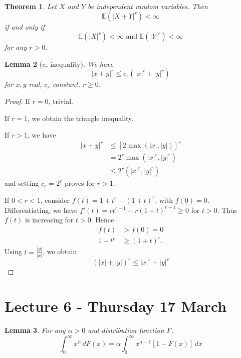 \documentclass[10pt, oneside, reqno]{amsart}
\theoremstyle{plain}%
\newtheorem{thm}{Theorem}[section]
\newtheorem{lem}[thm]{Lemma}
\theoremstyle{definition}
\theoremstyle{remark}
\newcommand{\E}{\mathbb{E}}
\begin{document}
\begin{thm}
	Let $X$ and $Y$ be independent random variables.  Then \[
		\E(|X+Y|^r) < \infty
	\] if and only if \[
		\E(|X|^r) < \infty \text{ and } \E(|Y|^r) < \infty
	\] for any $r > 0$.
\end{thm}

\begin{lem}[$c_r$ inequality]
	We have \[
		|x+y|^r \leq c_r \left( |x|^r + |y|^r \right) 
	\] for $x,y$ real, $c_r$ constant, $r \geq 0$.
\end{lem}
\begin{proof}
	If $r = 0$, trivial.  
	
	If $r = 1$, we obtain the triangle inequality.
	
	If $r > 1$, we have \begin{align*}
		|x+y|^r &\leq [ 2 \max( |x|, |y|) ]^r \\
				&= 2^r \max(|x|^r, |y|^r) \\
				&\leq 2^r (|x|^r, |y|^r)
	\end{align*} and setting $c_r = 2^r$ proves for $r > 1$.
					
	If $ 0 < r < 1$, consider $f(t) = 1 + t^r - (1+t)^r$, with $f(0) = 0$.  Differentiating, we have $f'(t) = rt^{r-1} - r(1+t)^{r-1} \geq 0$ for $t > 0$.  Thus $f(t)$ is increasing for $t >0$.  Hence \begin{align*}
		f(t) &> f(0) = 0 \\
		1+t^r &\geq (1+t)^r.
	\end{align*}  Using $t = \frac{|y|}{|x|}$, we obtain \[
		(|x| + |y|)^r \leq |x|^r + |y|^r
	\]
	
\end{proof}


\section{Lecture 6 - Thursday 17 March} %
\label{sec:lecture_6_thursday_17_march}
\begin{lem}
	For any $\alpha > 0$ and distribution function $F$, \[
		\int_0^\infty x^{\alpha} \, dF(x) = \alpha \int_0^\infty x^{\alpha - 1} [ 1 - F(x)] \, dx
	\]
\end{lem}
\end{document}
